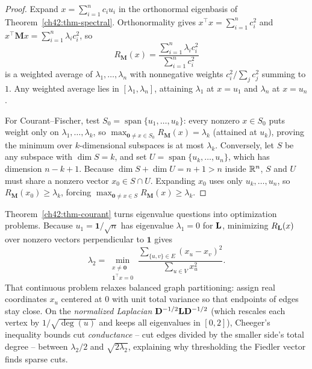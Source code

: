 \begin{proof}
Expand $x = \sum_{i=1}^n c_i u_i$ in the orthonormal eigenbasis of Theorem~\ref{ch42:thm-spectral}. Orthonormality gives $x^\top x = \sum_{i=1}^n c_i^2$ and $x^\top\mathbf{M}x = \sum_{i=1}^n \lambda_i c_i^2$, so
\[
  R_{\mathbf{M}}(x) = \frac{\sum_{i=1}^n \lambda_i c_i^2}{\sum_{i=1}^n c_i^2}
\]
is a weighted average of $\lambda_1,\dots,\lambda_n$ with nonnegative weights $c_i^2 / \sum_j c_j^2$ summing to $1$. Any weighted average lies in $[\lambda_1, \lambda_n]$, attaining $\lambda_1$ at $x = u_1$ and $\lambda_n$ at $x = u_n$.

For Courant--Fischer, test $S_0 = \operatorname{span}\{u_1,\dots,u_k\}$: every nonzero $x \in S_0$ puts weight only on $\lambda_1,\dots,\lambda_k$, so $\max_{\mathbf{0} \ne x \in S_0} R_{\mathbf{M}}(x) = \lambda_k$ (attained at $u_k$), proving the minimum over $k$-dimensional subspaces is at most $\lambda_k$. Conversely, let $S$ be any subspace with $\dim S = k$, and set $U = \operatorname{span}\{u_k,\dots,u_n\}$, which has dimension $n - k + 1$. Because $\dim S + \dim U = n + 1 > n$ inside $\mathbb{R}^n$, $S$ and $U$ must share a nonzero vector $x_0 \in S \cap U$. Expanding $x_0$ uses only $u_k,\dots,u_n$, so $R_{\mathbf{M}}(x_0) \ge \lambda_k$, forcing $\max_{\mathbf{0} \ne x \in S} R_{\mathbf{M}}(x) \ge \lambda_k$.
\end{proof}

\begin{whybox}
Theorem~\ref{ch42:thm-courant} turns eigenvalue questions into optimization problems. Because $u_1 = \mathbf{1}/\sqrt{n}$ has eigenvalue $\lambda_1 = 0$ for $\mathbf{L}$, minimizing $R_{\mathbf{L}}(x)$ over nonzero vectors perpendicular to $\mathbf{1}$ gives
\[
  \lambda_2 = \min_{\substack{x \ne \mathbf{0} \\ \mathbf{1}^\top x = 0}} \frac{\sum_{\{u,v\}\in E} (x_u - x_v)^2}{\sum_{u\in V} x_u^2}.
\]
That continuous problem relaxes balanced graph partitioning: assign real coordinates $x_u$ centered at $0$ with unit total variance so that endpoints of edges stay close. On the \emph{normalized Laplacian} $\mathbf{D}^{-1/2}\mathbf{L}\mathbf{D}^{-1/2}$ (which rescales each vertex by $1/\sqrt{\deg(u)}$ and keeps all eigenvalues in $[0,2]$), Cheeger's inequality bounds cut \emph{conductance} -- cut edges divided by the smaller side's total degree -- between $\lambda_2/2$ and $\sqrt{2\lambda_2}$, explaining why thresholding the Fiedler vector finds sparse cuts.
\end{whybox}

